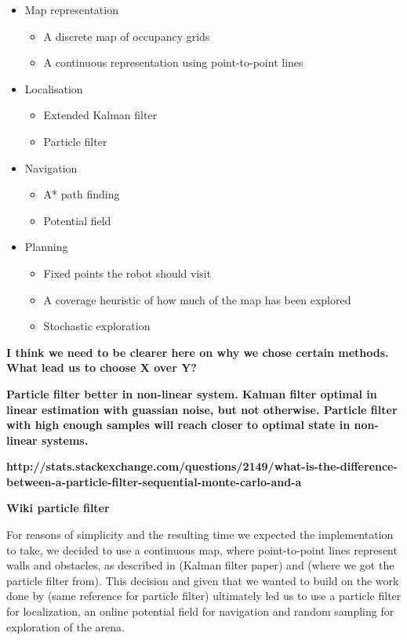 \documentclass[paper=a4, fontsize=12pt]{scrartcl}	%
\numberwithin{equation}{section}		%
\numberwithin{figure}{section}			%
\numberwithin{table}{section}				%
\begin{document}
\begin{itemize}
\item Map representation 
\begin{itemize}
\item A discrete map of occupancy grids
\item A continuous representation using point-to-point lines
\end{itemize}
\item Localisation
\begin{itemize}
\item Extended Kalman filter
\item Particle filter
\end{itemize}
\item Navigation
\begin{itemize}
\item A* path finding
\item Potential field
\end{itemize}
\item Planning
\begin{itemize}
\item Fixed points the robot should visit
\item A coverage heuristic of how much of the map has been explored
\item Stochastic exploration
\end{itemize}
\end{itemize}

\textbf{I think we need to be clearer here on why we chose certain methods. What lead us to choose X over Y?}

\textbf{Particle filter better in non-linear system. Kalman filter optimal in linear estimation with guassian noise, but not otherwise. Particle filter with high enough samples will reach closer to optimal state in non-linear systems.}

\textbf{http://stats.stackexchange.com/questions/2149/what-is-the-difference-between-a-particle-filter-sequential-monte-carlo-and-a}

\textbf{Wiki particle filter}


For reasons of simplicity and the resulting time we expected the implementation to take, we decided to use a continuous map, where point-to-point lines represent walls and obstacles, as described in (Kalman filter paper) and (where we got the particle filter from). This decision and given that we wanted to build on the work done by (same reference for particle filter) ultimately led us to use a particle filter for localization, an online potential field for navigation and random sampling for exploration of the arena.
\end{document}
